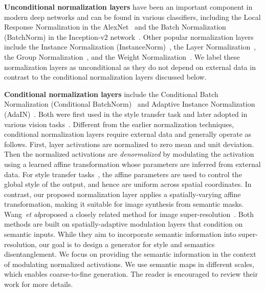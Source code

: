 {\bf Unconditional normalization layers} have been an important component in modern deep networks and can be found in various classifiers, including the Local Response Normalization in the AlexNet~\cite{krizhevsky2012imagenet} and the Batch Normalization (BatchNorm) in the Inception-v2 network~\cite{ioffe2015batch}. Other popular normalization layers include the Instance Normalization (InstanceNorm)~\cite{ulyanov1607instance}, the Layer Normalization~\cite{ba2016layer}, the Group Normalization~\cite{wu2018group}, and the Weight Normalization~\cite{salimans2016weight}. We label these normalization layers as unconditional as they do not depend on external data in contrast to the conditional normalization layers discussed below.

{\bf Conditional normalization layers} include the Conditional Batch Normalization (Conditional BatchNorm)~\cite{dumoulin2016learned} and Adaptive Instance Normalization (AdaIN)~\cite{huang2017adain}. Both were first used in the style transfer task and later adopted in various vision tasks~\cite{de2017modulating,perez2017learning,huang2018multimodal,miyato2018cgans,zhang2018self,mescheder2018training,wang2018recovering,chen2018on,brock2018large,karras2018style}. Different from the earlier normalization techniques, conditional normalization layers require external data and generally operate as follows. First, layer activations are normalized to zero mean and unit deviation. Then the normalized activations are \textit{denormalized} by modulating the activation using a learned affine transformation whose parameters are inferred from external data. For style transfer tasks~\cite{dumoulin2016learned,huang2017adain}, the affine parameters are used to control the global style of the output, and hence are uniform across spatial coordinates. In contrast, our proposed normalization layer applies a spatially-varying affine transformation, making it suitable for image synthesis from semantic masks. Wang~\emph{et al}\onedot proposed a closely related method for image super-resolution~\cite{wang2018recovering}. Both methods are built on spatially-adaptive modulation layers that condition on semantic inputs. While they aim to incorporate semantic information into super-resolution, our goal is to design a generator for style and semantics disentanglement. We focus on providing the semantic information in the context of modulating normalized activations. We use semantic maps in different scales, which enables coarse-to-fine generation. The reader is encouraged to review  their work for more details. 

